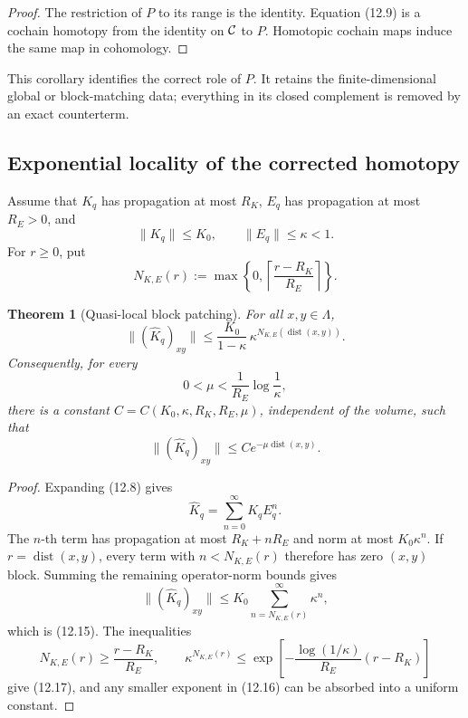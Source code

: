 \documentclass[11pt]{article}
\newtheorem{theorem}{Theorem}[section]
\theoremstyle{remark}
\begin{document}
\begin{proof}
The restriction of \(P\) to its range is the identity.  Equation
(12.9) is a cochain homotopy from the identity on \({\cal C}\) to
\(P\).  Homotopic cochain maps induce the same map in cohomology.
\end{proof}

This corollary identifies the correct role of \(P\).  It retains the
finite-dimensional global or block-matching data; everything in its
closed complement is removed by an exact counterterm.

\subsection{Exponential locality of the corrected homotopy}

Assume that \(K_q\) has propagation at most \(R_K\), \(E_q\) has
propagation at most \(R_E>0\), and
\[
                         \|K_q\|\le K_0,\qquad
                         \|E_q\|\le\kappa<1.                \tag{12.13}
\]
For \(r\ge0\), put
\[
 N_{K,E}(r):=
 \max\left\{0,
 \left\lceil\frac{r-R_K}{R_E}\right\rceil\right\}.           \tag{12.14}
\]

\begin{theorem}[Quasi-local block patching]
\label{thm:v12v12-local}
For all \(x,y\in\Lambda\),
\[
 \boxed{
 \|(\widehat K_q)_{xy}\|
 \le\frac{K_0}{1-\kappa}\,
       \kappa^{N_{K,E}(\operatorname{dist}(x,y))}.}          \tag{12.15}
\]
Consequently, for every
\[
             0<\mu<\frac1{R_E}\log\frac1\kappa,             \tag{12.16}
\]
there is a constant
\(C=C(K_0,\kappa,R_K,R_E,\mu)\), independent of the volume, such
that
\[
                    \|(\widehat K_q)_{xy}\|
 \le Ce^{-\mu\operatorname{dist}(x,y)}.                     \tag{12.17}
\]
\end{theorem}

\begin{proof}
Expanding (12.8) gives
\[
                         \widehat K_q
 =\sum_{n=0}^{\infty}K_qE_q^n.                             \tag{12.18}
\]
The \(n\)-th term has propagation at most \(R_K+nR_E\) and norm at
most \(K_0\kappa^n\).  If
\(r=\operatorname{dist}(x,y)\), every term with
\(n<N_{K,E}(r)\) therefore has zero \((x,y)\) block.  Summing the
remaining operator-norm bounds gives
\[
 \|(\widehat K_q)_{xy}\|
 \le K_0\sum_{n=N_{K,E}(r)}^\infty\kappa^n,
\]
which is (12.15).  The inequalities
\[
 N_{K,E}(r)\ge\frac{r-R_K}{R_E},
 \qquad
 \kappa^{N_{K,E}(r)}
 \le
 \exp\left[-\frac{\log(1/\kappa)}{R_E}(r-R_K)\right]         \tag{12.19}
\]
give (12.17), and any smaller exponent in (12.16) can be absorbed
into a uniform constant.
\end{proof}
\end{document}
